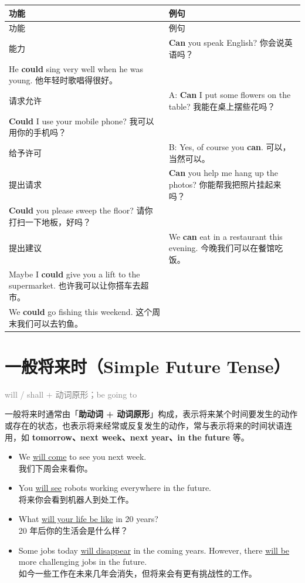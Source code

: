 \documentclass[11pt,a4paper]{ctexart}
\begin{document}
{\footnotesize
\begin{longtable}{p{6.70cm}p{6.70cm}}
\hline
功能 & 例句 \\
\hline
\endfirsthead
\hline
功能 & 例句 \\
\hline
\endhead
\hline
\endfoot
能力 & \textbf{Can} you speak English? 你会说英语吗？\\ He \textbf{could} sing very well when he was young. 他年轻时歌唱得很好。 \\
请求允许 & A: \textbf{Can} I put some flowers on the table? 我能在桌上摆些花吗？\\ \textbf{Could} I use your mobile phone? 我可以用你的手机吗？ \\
给予许可 & B: Yes, of course you \textbf{can}. 可以，当然可以。 \\
提出请求 & \textbf{Can} you help me hang up the photos? 你能帮我把照片挂起来吗？\\ \textbf{Could} you please sweep the floor? 请你打扫一下地板，好吗？ \\
提出建议 & We \textbf{can} eat in a restaurant this evening. 今晚我们可以在餐馆吃饭。\\ Maybe I \textbf{could} give you a lift to the supermarket. 也许我可以让你搭车去超市。\\ We \textbf{could} go fishing this weekend. 这个周末我们可以去钓鱼。 \\
\end{longtable}
}

\begin{center}\end{center}

\section{一般将来时（Simple Future Tense）}
\noindent\textcolor{gray}{will / shall + 动词原形；be going to}\par\smallskip
一般将来时通常由「\textbf{助动词 + 动词原形}」构成，表示将来某个时间要发生的动作或存在的状态，也表示将来经常或反复发生的动作，常与表示将来的时间状语连用，如 \textbf{tomorrow、next week、next year、in the future} 等。

\begin{itemize}[leftmargin=1.4em]
\item We \underline{will come} to see you next week.\\ 我们下周会来看你。
\item You \underline{will see} robots working everywhere in the future.\\ 将来你会看到机器人到处工作。
\item What \underline{will your life be like} in 20 years?\\ 20 年后你的生活会是什么样？
\item Some jobs today \underline{will disappear} in the coming years. However, there \underline{will be} more challenging jobs in the future.\\ 如今一些工作在未来几年会消失，但将来会有更有挑战性的工作。
\end{itemize}
\end{document}
